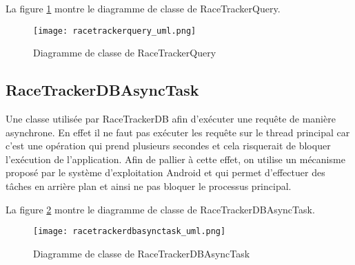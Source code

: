 La figure \ref{fig:racetrackerquery_uml} montre le diagramme de classe de RaceTrackerQuery.

\begin{figure}[htb]
\centering 
\texttt{[image: racetrackerquery\_uml.png]} 
\caption{Diagramme de classe de RaceTrackerQuery}
\label{fig:racetrackerquery_uml}
 \end{figure}

\subsection{RaceTrackerDBAsyncTask}

Une classe utilisée par RaceTrackerDB afin d'exécuter une requête de manière asynchrone. En effet il ne faut pas exécuter les requête sur le thread principal car c'est une opération qui prend plusieurs secondes et cela risquerait de bloquer l'exécution de l'application. Afin de pallier à cette effet, on utilise un mécanisme proposé par le système d'exploitation Android et qui permet d'effectuer des tâches en arrière plan et ainsi ne pas bloquer le processus principal.

La figure \ref{fig:racetrackerdbasynctask_uml} montre le diagramme de classe de RaceTrackerDBAsyncTask.

\begin{figure}[htb]
\centering 
\texttt{[image: racetrackerdbasynctask\_uml.png]} 
\caption{Diagramme de classe de RaceTrackerDBAsyncTask}
\label{fig:racetrackerdbasynctask_uml}
 \end{figure}

